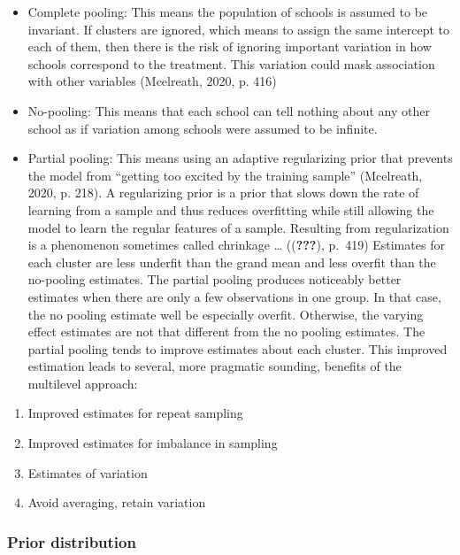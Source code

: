 \documentclass[a4, 12pt]{article}
\providecommand{\tightlist}{%
  \setlength{\itemsep}{0pt}\setlength{\parskip}{0pt}}
\begin{document}
\begin{itemize}
\item
  Complete pooling: This means the population of schools is assumed to be invariant. If clusters are ignored, which means to assign the same intercept to each of them, then there is the risk of ignoring important variation in how schools correspond to the treatment. This variation could mask association with other variables (Mcelreath, 2020, p. 416)
\item
  No-pooling: This means that each school can tell nothing about any other school as if variation among schools were assumed to be infinite.
\item
  Partial pooling: This means using an adaptive regularizing prior that prevents the model from ``getting too excited by the training sample'' (Mcelreath, 2020, p. 218). A regularizing prior is a prior that slows down the rate of learning from a sample and thus reduces overfitting while still allowing the model to learn the regular features of a sample. Resulting from regularization is a phenomenon sometimes called chrinkage \ldots{} (({\textbf{???}}), p.~419) Estimates for each cluster are less underfit than the grand mean and less overfit than the no-pooling estimates. The partial pooling produces noticeably better estimates when there are only a few observations in one group. In that case, the no pooling estimate well be especially overfit. Otherwise, the varying effect estimates are not that different from the no pooling estimates. The partial pooling tends to improve estimates about each cluster. This improved estimation leads to several, more pragmatic sounding, benefits of the multilevel approach:
\end{itemize}

\begin{enumerate}
\def\labelenumi{\arabic{enumi}.}
\tightlist
\item
  Improved estimates for repeat sampling
\item
  Improved estimates for imbalance in sampling
\item
  Estimates of variation
\item
  Avoid averaging, retain variation
\end{enumerate}

\hypertarget{prior-distribution}{%
\subsubsection{Prior distribution}\label{prior-distribution}}
\end{document}
